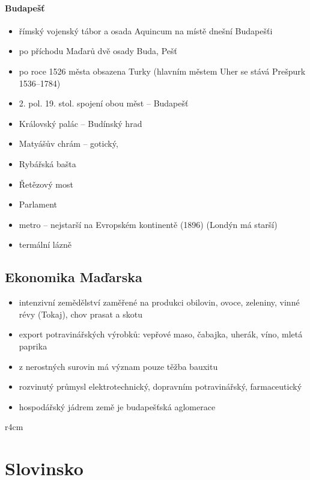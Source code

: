 \paragraph{Budapešť}
\begin{itemize}
\item římský vojenský tábor a osada Aquincum na místě dnešní Budapešťi
\item po příchodu Maďarů dvě osady Buda, Pešť
\item po roce 1526 města obsazena Turky (hlavním městem Uher se stává Prešpurk 1536--1784)
\item 2. pol. 19. stol. spojení obou měst -- Budapešť
\item Královský palác -- Budínský hrad
\item Matyášův chrám -- gotický, 
\item Rybářská bašta
\item Řetězový most
\item Parlament
\item metro -- nejstarší na Evropském kontinentě (1896) (Londýn má starší)
\item termální lázně 
\end{itemize}

\subsection{Ekonomika Maďarska}
\begin{itemize}
\item intenzivní zemědělství zaměřené na produkci obilovin, ovoce, zeleniny, vinné révy (Tokaj), chov prasat a skotu
\item export potravinářských výrobků: vepřové maso, čabajka, uherák, víno, mletá paprika
\item z nerostných surovin má význam pouze těžba bauxitu
\item rozvinutý průmysl elektrotechnický, dopravním potravinářský, farmaceutický
\item hospodářský jádrem země je budapešťská aglomerace
\end{itemize}



\newpage
\mbox{}
\vspace{-1.5cm}
\begin{wrapfigure}{r}{4cm}
\vspace{-50pt}
\end{wrapfigure}	
\section{Slovinsko}
